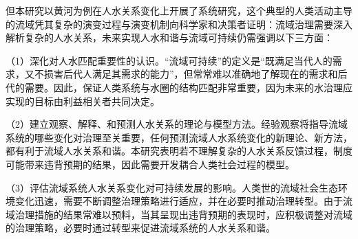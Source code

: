 但本研究以黄河为例在人\textendash{}水关系变化上开展了系统研究，这个典型的人类活动主导的流域凭其复杂的演变过程与演变机制向科学家和决策者证明：流域治理需要深入解析复杂的人\textendash{}水关系，未来实现人水和谐与流域可持续仍需强调以下三方面：

（1）深化对人水匹配重要性的认识。“流域可持续”的定义是“既满足当代人的需求，又不损害后代人满足其需求的能力”，但常常难以准确地了解现在的需求和后代的需要。因此，保证人类系统与水圈的结构匹配非常重要，因为未来的水治理应实现的目标由利益相关者共同决定。

（2）建立观察、解释、和预测人\textendash{}水关系的理论与模型方法。经验观察将指导流域系统的哪些变化对治理至关重要，任何预测流域人\textendash{}水系统变化的新理论、新方法，都有利于流域人\textendash{}水关系和谐。本研究表明若不理解复杂的人\textendash{}水关系反馈过程，制度可能带来违背预期的结果，因此需要开发耦合人类社会过程的模型。

（3）评估流域系统人\textendash{}水关系变化对可持续发展的影响。人类世的流域社会\textendash{}生态环境变化迅速，需要不断调整治理策略进行适应，并在必要时推动治理转型。由于流域治理措施的结果常难以预料，当其呈现出违背预期的表现时，应积极调整对流域的治理策略，必要时通过转型来促进流域系统的人\textendash{}水关系和谐。
